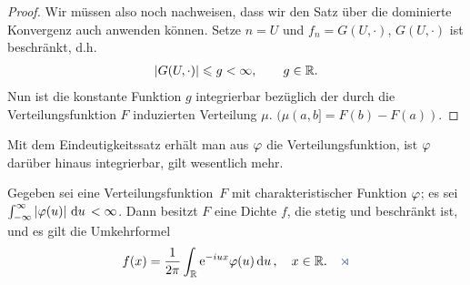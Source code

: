 \begin{proof}
Wir müssen also noch nachweisen, dass wir den Satz über die dominierte
Konvergenz auch anwenden können. Setze $n=U$ und $f_n=G(U,\cdot)$,
$G(U,\cdot)$ ist beschränkt, d.h.
\begin{align*}
\left|G(U,\cdot)\right| \leqslant g < \infty,\qquad g\in \mathbb{R}. 
\end{align*}
Nun ist die konstante Funktion $g$ integrierbar bezüglich der durch die
Verteilungsfunktion $F$ induzierten Verteilung $\mu$.
$(\mu(a,b]=F(b)-F(a))$.\qedhere
\end{proof}

Mit dem Eindeutigkeitssatz erhält man aus $\varphi$ die Verteilungsfunktion, ist
$\varphi$ darüber hinaus integrierbar, gilt wesentlich mehr.

\begin{prop}
\label{prop:6.5}
Gegeben sei eine Verteilungsfunktion\ $F$ mit charakteristischer Funktion
$\varphi$; es sei $\int^{\infty}_{-\infty} \left|\varphi(u)\right|\,\mathrm{d} u\, < \infty
$. Dann besitzt $F$ eine Dichte $f$, die stetig und beschränkt ist, und es gilt
die Umkehrformel
\begin{align*}
f(x) = \frac{1}{2\pi }  \int_{\R} \e^ {-iux} \varphi (u) \du,\quad
x\in \R.\fishhere
\end{align*}
\end{prop}

